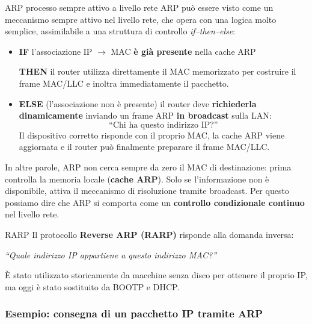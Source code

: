 \documentclass[a4paper,12pt]{report}
\begin{document}
\begin{notebox}{ARP processo sempre attivo a livello rete}
    ARP può essere visto come un meccanismo sempre attivo nel livello rete, che opera con una
logica molto semplice, assimilabile a una struttura di controllo \textit{if–then–else}:

\begin{itemize}
    \item \textbf{IF} l’associazione IP $\rightarrow$ MAC \textbf{è già presente} nella cache ARP  

    
          \textbf{THEN} il router utilizza direttamente il MAC memorizzato per costruire il frame MAC/LLC
          e inoltra immediatamente il pacchetto.

    \item \textbf{ELSE} (l’associazione non è presente)  
          il router deve \textbf{richiederla dinamicamente} inviando un frame ARP \textbf{in broadcast} sulla LAN:
          \[
              \text{``Chi ha questo indirizzo IP?''}
          \]
          Il dispositivo corretto risponde con il proprio MAC, la cache ARP viene aggiornata e il router
          può finalmente preparare il frame MAC/LLC.
\end{itemize}

In altre parole, ARP non cerca sempre da zero il MAC di destinazione: prima controlla la memoria
locale (\textbf{cache ARP}). Solo se l’informazione non è disponibile, attiva il meccanismo di
risoluzione tramite broadcast. Per questo possiamo dire che ARP si comporta come un
\textbf{controllo condizionale continuo} nel livello rete.

\end{notebox}

\begin{notebox}{RARP}
Il protocollo \textbf{Reverse ARP (RARP)} risponde alla domanda inversa:

\begin{center}
\textit{``Quale indirizzo IP appartiene a questo indirizzo MAC?''}
\end{center}

È stato utilizzato storicamente da macchine senza disco per ottenere il proprio IP,
ma oggi è stato sostituito da BOOTP e DHCP.
\end{notebox}

\subsubsection{Esempio: consegna di un pacchetto IP tramite ARP}
\end{document}
